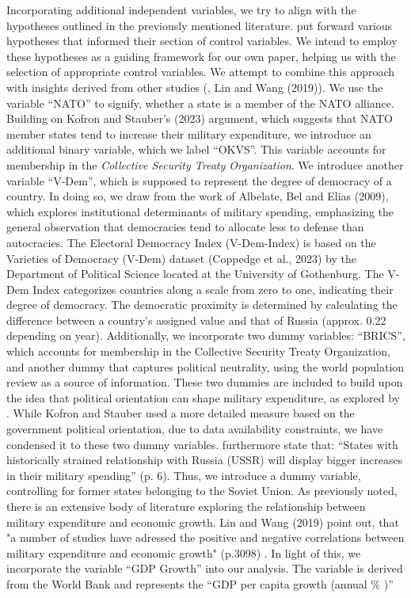 \documentclass[12pt,a4paper]{article}
\begin{document}
Incorporating additional independent variables, we try to align with the hypotheses outlined in the previously mentioned literature. \citet{kofrovn2023} put forward various hypotheses that informed their section of control variables. We intend to employ these hypotheses as a guiding framework for our own paper, helping us with the selection of appropriate control variables. We attempt to combine this approach with insights derived from other studies (\citet{nordhaus2012}, Lin and Wang (2019)). We use the variable “NATO” to signify, whether a state is a member of the NATO alliance. Building on Kofron and Stauber’s (2023) argument, which suggests that NATO member states tend to increase their military expenditure, we introduce an additional binary variable, which we label “OKVS”. This variable accounts for membership in the \textit{Collective Security Treaty Organization}. 
We introduce another variable “V-Dem”, which is supposed to represent the degree of democracy of a country. In doing so, we draw from the work of Albelate, Bel and Elias (2009), which explores institutional determinants of military spending, emphasizing the general observation that democracies tend to allocate less to defense than autocracies. The Electoral Democracy Index (V-Dem-Index) is based on the Varieties of Democracy (V-Dem) dataset (Coppedge et al., 2023) by the Department of Political Science located at the University of Gothenburg. The V-Dem Index categorizes countries along a scale from zero to one, indicating their degree of democracy. The democratic proximity is determined by calculating the difference between a country’s assigned value and that of Russia (approx. 0.22 depending on year). Additionally, we incorporate two dummy variables: “BRICS”, which accounts for membership in the Collective Security Treaty Organization, and another dummy that captures political neutrality, using the world population review as a source of information. These two dummies are included to build upon the idea that political orientation can shape military expenditure, as explored by \citet{kofrovn2023}. While Kofron and Stauber used a more detailed measure based on the government political orientation, due to data availability constraints, we have condensed it to these two dummy variables. \citet{kofrovn2023} furthermore state that: “States with historically strained relationship with Russia (USSR) will display bigger increases in their military spending” (p. 6). Thus, we introduce a dummy variable, controlling for former states belonging to the Soviet Union. As previously noted, there is an extensive body of literature exploring the relationship between military expenditure and economic growth. Lin and Wang (2019) point out, that "a number of studies have adressed the positive and negative correlations between military expenditure and economic growth" (p.3098) . In light of this, we incorporate the variable “GDP Growth” into our analysis. The variable is derived from the World Bank and represents the “GDP per capita growth (annual \% )”\\
\end{document}
